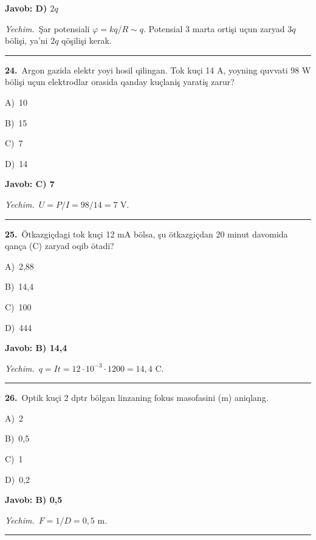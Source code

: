 \documentclass[11pt,a4paper]{article}
\newcommand{\opt}[2]{\hspace*{4mm}#1)\ #2\par}
\begin{document}
\noindent\colorbox{gray!12}{\parbox{\dimexpr\linewidth-2\fboxsep}{\textbf{Javob: D) $2q$}}}\par\smallskip
\noindent\textit{Yechim.}\ Şar potensiali $\varphi=kq/R\sim q$. Potensial 3 marta ortişi uçun zaryad $3q$ bölişi, ya’ni $2q$ qöşilişi kerak.\par\par\medskip\hrule\medskip
{}\noindent\begin{minipage}{\linewidth}
\textbf{24.}\ Argon gazida elektr yoyi hosil qilingan. Tok kuçi 14 A, yoyning quvvati 98 W bölişi uçun elektrodlar orasida qanday kuçlaniş yaratiş zarur?\par\smallskip
\opt{A}{10}
\opt{B}{15}
\opt{C}{7}
\opt{D}{14}
\end{minipage}\vspace{2pt}\par
\noindent\colorbox{gray!12}{\parbox{\dimexpr\linewidth-2\fboxsep}{\textbf{Javob: C) 7}}}\par\smallskip
\noindent\textit{Yechim.}\ $U=P/I=98/14=7$ V.\par\par\medskip\hrule\medskip
{}\noindent\begin{minipage}{\linewidth}
\textbf{25.}\ Ötkazgiçdagi tok kuçi 12 mA bölsa, şu ötkazgiçdan 20 minut davomida qança (C) zaryad oqib ötadi?\par\smallskip
\opt{A}{2,88}
\opt{B}{14,4}
\opt{C}{100}
\opt{D}{444}
\end{minipage}\vspace{2pt}\par
\noindent\colorbox{gray!12}{\parbox{\dimexpr\linewidth-2\fboxsep}{\textbf{Javob: B) 14,4}}}\par\smallskip
\noindent\textit{Yechim.}\ $q=It=12\cdot10^{-3}\cdot1200=14{,}4$ C.\par\par\medskip\hrule\medskip
{}\noindent\begin{minipage}{\linewidth}
\textbf{26.}\ Optik kuçi 2 dptr bölgan linzaning fokus masofasini (m) aniqlang.\par\smallskip
\opt{A}{2}
\opt{B}{0,5}
\opt{C}{1}
\opt{D}{0,2}
\end{minipage}\vspace{2pt}\par
\noindent\colorbox{gray!12}{\parbox{\dimexpr\linewidth-2\fboxsep}{\textbf{Javob: B) 0,5}}}\par\smallskip
\noindent\textit{Yechim.}\ $F=1/D=0{,}5$ m.\par\par\medskip\hrule\medskip
\end{document}
